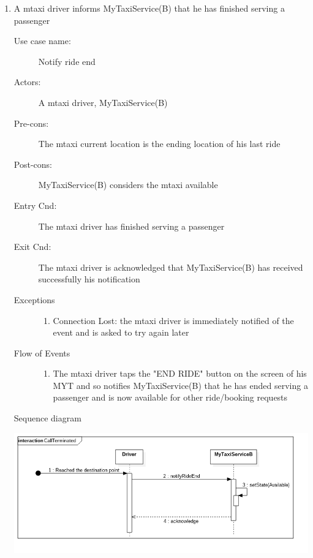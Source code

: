 \documentclass[11pt,titlepage]{article} %
\begin{document}
\begin{enumerate}
	
	       \item A mtaxi driver informs MyTaxiService(B) that he has finished serving a passenger
		\begin{description}
		        \item [Use case name:] Notify ride end
		        \item [Actors:] A mtaxi driver, MyTaxiService(B)
		        \item [Pre-cons:] The mtaxi current location is the ending location of his last ride
		        \item [Post-cons:] MyTaxiService(B) considers the mtaxi available
		        \item [Entry Cnd:] The mtaxi driver has finished serving a passenger
		        \item [Exit Cnd:] The mtaxi driver is acknowledged that MyTaxiService(B) has received successfully his
		        notification
		        \item [Exceptions]\hfill
			\begin{enumerate}
			          \item Connection Lost: the mtaxi driver is immediately notified of the event and is asked to try again
			          later
			\end{enumerate}
		        \item [Flow of Events]\hfill
			\begin{enumerate}
			          \item The mtaxi driver taps the "END RIDE" button on the screen of his MYT and so notifies MyTaxiService(B) that
			          he has ended serving a passenger and is now available for other ride/booking requests
			\end{enumerate}
		\end{description}
		Sequence diagram
		\begin{center}
		\includegraphics[scale=0.52]{usecase4.png}
		\end{center}
	

\end{enumerate}
\end{document}
